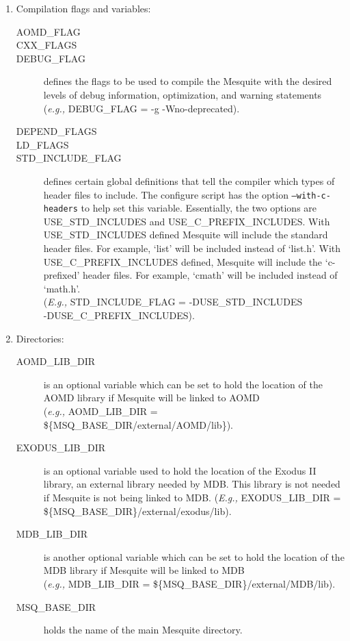 \documentclass[letter]{report}
\begin{document}
\begin{enumerate}
\item Compilation flags and variables:
  \begin{description}
  \item[AOMD\_FLAG]
  \item[CXX\_FLAGS]
  \item[DEBUG\_FLAG] defines the flags to be used to compile the Mesquite
	with the desired levels of debug information, optimization, and
	warning statements\\
	({\it e.g.,} DEBUG\_FLAG = -g -Wno-deprecated).
  \item[DEPEND\_FLAGS]
  \item[LD\_FLAGS]
  \item[STD\_INCLUDE\_FLAG] defines certain global definitions that
	tell the compiler which types of header files to include. The configure script has the
	option \texttt{--with-c-headers} to help set this variable.
 	Essentially, the two options are USE\_STD\_INCLUDES and
	USE\_C\_PREFIX\_INCLUDES.  With USE\_STD\_INCLUDES defined
	Mesquite will include the standard header files.  For example,
	`list' will be included instead of `list.h'.  With
	USE\_C\_PREFIX\_INCLUDES defined, Mesquite will include the
	`c-prefixed' header files.  For example, `cmath' will be
	included instead of `math.h'.  \\
	({\it E.g.,} STD\_INCLUDE\_FLAG = -DUSE\_STD\_INCLUDES\\
	-DUSE\_C\_PREFIX\_INCLUDES).
  \end{description}
\item Directories:
  \begin{description}
  \item[AOMD\_LIB\_DIR] is an optional variable which can be set
	to hold the location of the AOMD library if Mesquite will
	be linked to AOMD\\
	({\it e.g.,} AOMD\_LIB\_DIR = \$\{MSQ\_BASE\_DIR/external/AOMD/lib\}).
  \item[EXODUS\_LIB\_DIR] is an optional variable used to hold the
	location of the Exodus II library, an external library needed
	by MDB.  This library is not needed if Mesquite is not being
	linked to MDB.
	({\it E.g.,} EXODUS\_LIB\_DIR = \$\{MSQ\_BASE\_DIR\}/external/exodus/lib).
  \item[MDB\_LIB\_DIR] is another optional variable which can be set
	to hold the location of the MDB library if Mesquite will
	be linked to MDB\\
	({\it e.g.,} MDB\_LIB\_DIR = \$\{MSQ\_BASE\_DIR\}/external/MDB/lib).
  \item[MSQ\_BASE\_DIR] holds the name of the main Mesquite directory.

\end{description}
\end{enumerate}
\end{document}
